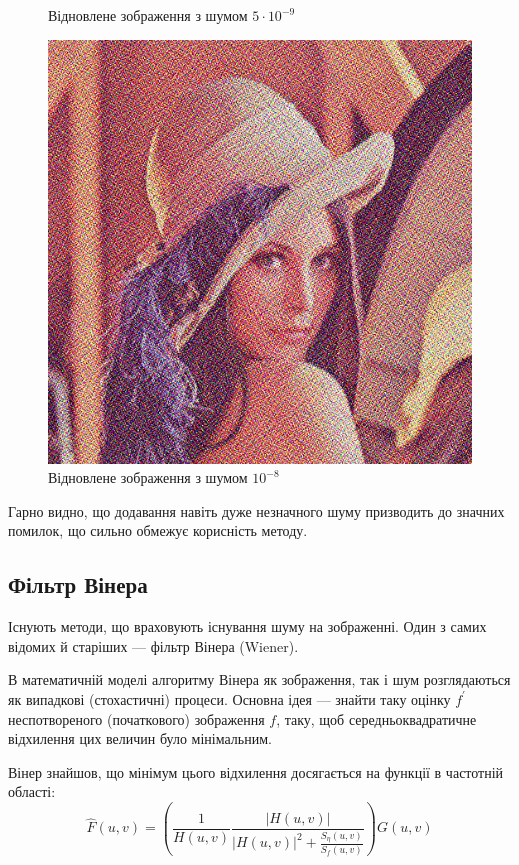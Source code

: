 \documentclass{diploma}
\begin{document}
\begin{figure}[htb]
          \caption{Відновлене зображення з шумом $5\cdot10^{-9}$}\label{fig:Lenna-b5e-9deconv}
        \endminipage\hfill
          \includegraphics[width=\linewidth]{Lenna-b1e-8deconv.png}
          \caption{Відновлене зображення з шумом $10^{-8}$}\label{fig:Lenna-b1e-8deconv}
        \endminipage\hfill
      \end{figure}
      Гарно видно, що додавання навіть дуже незначного шуму призводить до
      значних помилок, що сильно обмежує корисність методу.
      \clearpage
    \subsection{Фільтр Вінера}
      Існують методи, що враховують існування шуму на зображенні.
      Один з самих відомих й старіших --- фільтр Вінера (Wiener).

      В математичній моделі алгоритму Вінера як зображення, так і шум
      розглядаються як випадкові (стохастичні) процеси.
      Основна ідея --- знайти таку оцінку $f^\prime$ неспотвореного
      (початкового) зображення $f$, таку, щоб середньоквадратичне відхилення
      цих величин було мінімальним.

      Вінер знайшов, що мінімум цього відхилення досягається на функції в
      частотній області:
      \begin{equation}
        \hat{F}\left( u, v \right) = \left( \frac{1}{H\left( u, v \right)}
        \frac{\left| H\left( u, v \right)\right|}{\left|H\left( u, v
          \right)\right|^2 + \frac{S_\eta\left( u, v \right)}{S_f\left( u, v
          \right)}} \right) G\left( u, v \right)
        \label{eq:wiener1}
      \end{equation}
\end{document}
